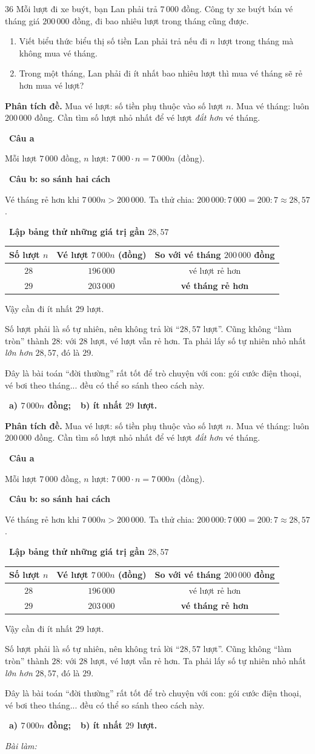 \documentclass[11pt]{article}
\newif\ifsol \soltrue
\providecommand{\AnsWord}{Đáp số}
\newcommand{\ans}[1]{\par\smallskip{\bfseries\color{tmGreen!88!black}\AnsWord:}\ {\bfseries\color{AnsRed}#1}\par}
\newcommand{\probsol}[1]{%
  \begin{lrbox}{\solmeasure}\begin{minipage}{\dimexpr\linewidth-24pt\relax}#1\end{minipage}\end{lrbox}%
  \ifsol
    \begin{solbox}#1\end{solbox}%
  \else
    \setlength{\solht}{\dimexpr\ht\solmeasure+\dp\solmeasure+0.85cm\relax}%
    \ifdim\solht<1.35cm\setlength{\solht}{1.35cm}\fi
    \ifdim\solht>\StudentMaxWork\setlength{\solht}{\StudentMaxWork}\fi
    \begin{tcolorbox}[colback=white,colframe=Line,boxrule=0.8pt,arc=5pt,
      left=8pt,right=8pt,top=4pt,bottom=4pt,height=\solht]{\footnotesize\color{Slate}\itshape\WorkWord}\end{tcolorbox}%
  \fi}
\newlength{\StudentMaxWork}\setlength{\StudentMaxWork}{7.5cm}
\newcommand{\step}[2]{\par\smallskip\noindent{\bfseries\color{tmBlue!85!black}\StepWord~#1.}\ {\bfseries #2}\par\nopagebreak}
\def\WorkWord{Bài làm:}
\def\AnsWord{Đáp số}
\def\StepWord{Bước}
\begin{document}
\begin{probbox}{36}{\relax}
Mỗi lượt đi xe buýt, bạn Lan phải trả $7\,000$ đồng. Công ty xe buýt bán vé tháng giá $200\,000$ đồng, đi bao nhiêu lượt trong tháng cũng được.
\begin{enumerate}[label=\alph*),leftmargin=1.6em,itemsep=1pt,topsep=2pt]
\item Viết biểu thức biểu thị số tiền Lan phải trả nếu đi $n$ lượt trong tháng mà không mua vé tháng.
\item Trong một tháng, Lan phải đi ít nhất bao nhiêu lượt thì mua vé tháng sẽ rẻ hơn mua vé lượt?
\end{enumerate}
\end{probbox}
\probsol{
\textbf{Phân tích đề.} Mua vé lượt: số tiền phụ thuộc vào số lượt $n$. Mua vé tháng: luôn $200\,000$ đồng. Cần tìm số lượt nhỏ nhất để vé lượt \emph{đắt hơn} vé tháng.
\step{1}{Câu a}
Mỗi lượt $7\,000$ đồng, $n$ lượt: $7\,000\cdot n=7\,000n$ (đồng).
\step{2}{Câu b: so sánh hai cách}
Vé tháng rẻ hơn khi $7\,000n>200\,000$. Ta thử chia: $200\,000:7\,000=200:7\approx 28{,}57$.
\step{3}{Lập bảng thử những giá trị gần $28{,}57$}
\begin{center}
\begin{tabular}{|c|c|c|}
\hline
\rowcolor{tmBlue!10} Số lượt $n$ & Vé lượt $7\,000n$ (đồng) & So với vé tháng $200\,000$ đồng\\ \hline
$28$ & $196\,000$ & vé lượt rẻ hơn\\ \hline
$29$ & $203\,000$ & \textbf{vé tháng rẻ hơn}\\ \hline
\end{tabular}
\end{center}
Vậy cần đi ít nhất $29$ lượt.
\begin{warnbox}Số lượt phải là số tự nhiên, nên không trả lời ``$28{,}57$ lượt''. Cũng không ``làm tròn'' thành $28$: với $28$ lượt, vé lượt vẫn rẻ hơn. Ta phải lấy số tự nhiên nhỏ nhất \emph{lớn hơn} $28{,}57$, đó là $29$.\end{warnbox}
\begin{parentbox}Đây là bài toán ``đời thường'' rất tốt để trò chuyện với con: gói cước điện thoại, vé bơi theo tháng... đều có thể so sánh theo cách này.\end{parentbox}
\ans{a) $7\,000n$ đồng;\ \ b) ít nhất $29$ lượt.}
}
\end{document}
